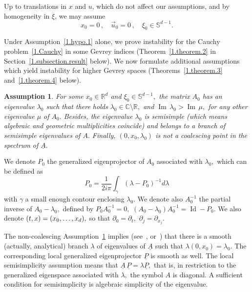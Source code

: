 \documentclass[AHL,Unicode,longabstracts,published]{cedram}
\theoremstyle{plain}
\newtheorem{hypo}[cdrthm]{Assumption} }
\newcommand*\R{{\mathbb R}}
\newcommand*\Cbb{{\mathbb C}}%
\newcommand{\dptl}{\partial}%
\DeclareMathOperator{\Id}{Id}
\DeclareMathOperator{\Imm}{Im}
\begin{document}
Up to translations in $x$ and $u$, which do not affect our assumptions, and by homogeneity in $\xi$, we may assume
\begin{equation}\label{1.etc}
x_0 = 0\,, \quad \vec{u}_0 = 0 \,, \quad \xi_0 \in \mathbb{S}^{d-1}.
\end{equation}

Under Assumption~\ref{1.hypo.1} alone, we prove instability for the Cauchy problem~\eqref{1.Cauchy} in some Gevrey indices (Theorem~\ref{1.theorem.2} in Section~\ref{1.subsection.result} below). We now formulate additional assumptions which yield instability for higher Gevrey spaces (Theorems~\ref{1.theorem.3} and~\ref{1.theorem.4} below).

\begin{hypo}\label{1.hypo.2}
For some $x_0 \in \R^d$ and $\xi_0 \in \mathbb{S}^{d-1},$ the matrix $A_0$ has an eigenvalue $\lambda_0$ such that there holds $\lambda_0 \in \Cbb \setminus \R,$ and ${\Imm} \, \lambda_0 > {\Imm} \, \mu,$ for any other eigenvalue $\mu$ of $A_0.$ Besides, the eigenvalue $\lambda_0$ is semisimple (which means algebraic and geometric multiplicities coincide) and belongs to a branch of semisimple eigenvalues of $A.$ Finally, $(0,x_0,\lambda_0)$ is not a coalescing point in the spectrum of $\underline A.$
\end{hypo}

\medskip

We denote $P_0$ the generalized eigenprojector of $A_0$ associated with $\lambda_0,$ which can be defined as
\[
P_0 = \frac{1}{2i\pi} \int_{\gamma} \left(\lambda - P_0\right)^{-1} d\lambda
\]
with $\gamma$ a small enough contour enclosing $\lambda_0$. We denote also $A_0^{-1}$ the partial inverse of $A_0-\lambda_0,$ defined by $P_0 A_0^{-1} = 0,$ $\left(A_0 - \lambda_0\right) A_0^{-1} = \Id - P_0.$ We also denote $(t,x)\linebreak= (x_0, \dots, x_d),$ so that $\dptl_0 = \dptl_t,$ $\dptl_j = \dptl_{x_j}.$

\begin{rema}\label{1.remark.asumm.2}
The non-coalescing Assumption~\ref{1.hypo.2} implies (see~\cite{kato2013perturbation}, or~\cite[Corollary~2.2]{texier2015rouche}) that there is a smooth (actually, analytical) branch $\lambda$ of eigenvalues of $\underline A$ such that $\lambda(0,x_0) = \lambda_0.$ The corresponding local generalized eigenprojector $\underline P$ is smooth as well. The local semisimplicity assumption means that $\underline A \,\underline P = \lambda \underline P,$ that is, in restriction to the generalized eigenspace associated with $\lambda,$ the symbol $A$ is diagonal. A sufficient condition for semisimplicity is algebraic simplicity of the eigenvalue.
\end{rema}
\end{document}
